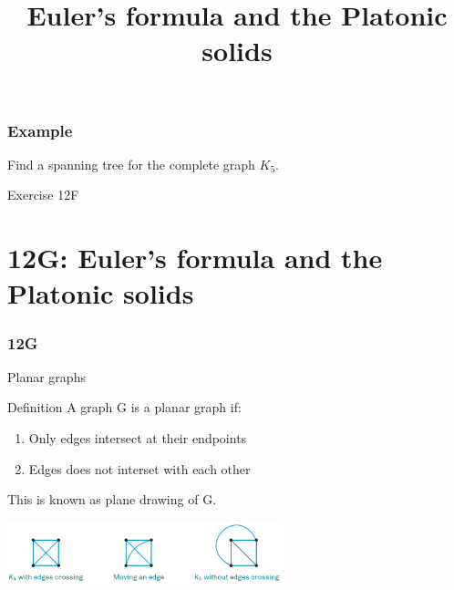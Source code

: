 \documentclass[
	11pt, %
]{beamer}
\begin{document}
\begin{frame}[t]
    \frametitle{Example}
    Find a spanning tree for the complete graph $K_5$.    
\end{frame}
\begin{frame}
\end{frame}

\begin{frame}{Exercise 12F}
\end{frame}

\section{12G: Euler's formula and the Platonic solids}
\begin{frame}
    \frametitle{12G}
    \begin{center}
        \title{Euler's formula and the Platonic solids}
        \maketitle
    \end{center}
\end{frame}

\begin{frame}{Planar graphs}
    \begin{block}{Definition}
        A graph G is a planar graph if:\\
        \begin{enumerate}
            \item Only edges intersect at their endpoints
            \item Edges does not interset with each other
        \end{enumerate}
        This is known as plane drawing of G.\\
        \begin{center}
            \includegraphics[width = 8cm]{Planar.png}\\
        \end{center}
    \end{block}
\end{frame}
\end{document}
